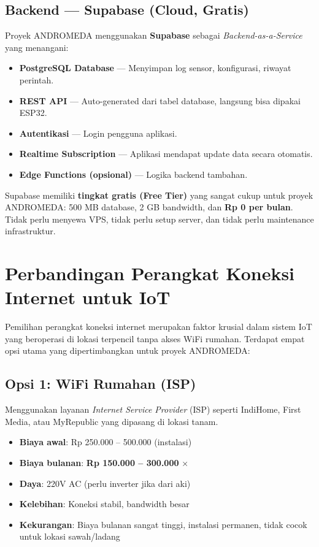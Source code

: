 \documentclass[12pt,a4paper,oneside]{report}
\begin{document}
\subsection{Backend — Supabase (Cloud, Gratis)}

Proyek ANDROMEDA menggunakan \textbf{Supabase} sebagai \textit{Backend-as-a-Service} yang menangani:

\begin{itemize}
    \item \textbf{PostgreSQL Database} — Menyimpan log sensor, konfigurasi, riwayat perintah.
    \item \textbf{REST API} — Auto-generated dari tabel database, langsung bisa dipakai ESP32.
    \item \textbf{Autentikasi} — Login pengguna aplikasi.
    \item \textbf{Realtime Subscription} — Aplikasi mendapat update data secara otomatis.
    \item \textbf{Edge Functions (opsional)} — Logika backend tambahan.
\end{itemize}

Supabase memiliki \textbf{tingkat gratis (Free Tier)} yang sangat cukup untuk proyek ANDROMEDA: 500 MB database, 2 GB bandwidth, dan \textbf{Rp 0 per bulan}. Tidak perlu menyewa VPS, tidak perlu setup server, dan tidak perlu maintenance infrastruktur.

\section{Perbandingan Perangkat Koneksi Internet untuk IoT}

Pemilihan perangkat koneksi internet merupakan faktor krusial dalam sistem IoT yang beroperasi di lokasi terpencil tanpa akses WiFi rumahan. Terdapat empat opsi utama yang dipertimbangkan untuk proyek ANDROMEDA:

\subsection{Opsi 1: WiFi Rumahan (ISP)}

Menggunakan layanan \textit{Internet Service Provider} (ISP) seperti IndiHome, First Media, atau MyRepublic yang dipasang di lokasi tanam.

\begin{itemize}
    \item \textbf{Biaya awal}: Rp 250.000 -- 500.000 (instalasi)
    \item \textbf{Biaya bulanan}: \textbf{Rp 150.000 -- 300.000} ×
    \item \textbf{Daya}: 220V AC (perlu inverter jika dari aki)
    \item \textbf{Kelebihan}: Koneksi stabil, bandwidth besar
    \item \textbf{Kekurangan}: Biaya bulanan sangat tinggi, instalasi permanen, tidak cocok untuk lokasi sawah/ladang
\end{itemize}
\end{document}
